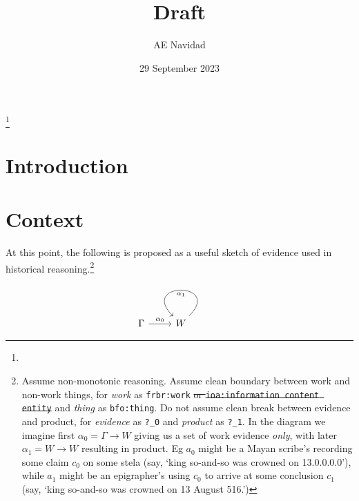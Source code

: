 \documentclass{amsart}%
\newcommand{\code}[1]{\texttt{#1}}%
\newcommand{\mention}[1]{\textit{#1}}%
\theoremstyle{plain}
\theoremstyle{definition}
\theoremstyle{remark}
\theoremstyle{definition}
\theoremstyle{remark}
\begin{document}
%
%
%
\title{Draft}
\author{AE Navidad}
\address{Harvard College, Cambridge, MA}%
{}
\date{29 September 2023}
\thanks{\lipsum[1][1]}%
\begin{abstract}
\lipsum[1]
\end{abstract}
\keywords{\lipsum[1][1]}
\maketitle
%
%
%
\section{Introduction}
\label{s:intro}
\lipsum[1-2]
%
%
%

%
%
%
%
%
\section{Context}
\label{s:cont}
\lipsum[1][1-3]

At this point, the following is proposed as a useful sketch of evidence used in historical reasoning.\footnote{Assume non-monotonic reasoning. Assume clean boundary between work and non-work things, for \mention{work} as \code{frbr:work} \sout{or \code{ioa:information content entity}} and \mention{thing} as \code{bfo:thing}. Do not assume clean break between evidence and product, for \mention{evidence} as \code{?\_0} and \mention{product} as \code{?\_1}. In the diagram we imagine first \(\alpha_0=\Gamma\to W\) giving us a set of work evidence \emph{only}, with later \(\alpha_1=W\to W\) resulting in product. Eg \(a_0\) might be a Mayan scribe's recording some claim \(c_0\) on some stela (say, `king so-and-so was crowned on 13.0.0.0.0'), while \(a_1\) might be an epigrapher's using \(c_0\) to arrive at some conclusion \(c_1\) (say, `king so-and-so was crowned on 13 August 516.')}%
\[
\begin{tikzcd}
\Gamma \ar[r,"\alpha_0"] & W\ar[loop,"\alpha_1"] %
\end{tikzcd}
\]
\end{document}
